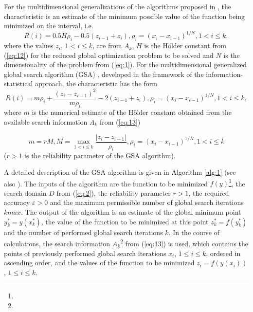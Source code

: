 \documentclass[review]{elsarticle}
\begin{document}
For the multidimensional generalizations of the algorithms proposed in \cite{c34,c35}, the characteristic is an estimate of the minimum possible value of the function being minimized on the interval, i.e.
\begin{equation}\label{eq:17}
R(i)=0.5 H \rho_i - 0.5 (z_{i-1} + z_i), \rho_i=(x_i - x_{i-1})^{1/N}, 1 < i \leq k,
\end{equation}
where the values $z_i$, $1<i \leq k$, are from $A_k$, $H$ is the H\"older constant from (\ref{eq:12}) for the reduced global optimization problem to be solved and $N$ is the dimensionality of the problem from (\ref{eq:1}). For the multidimensional generalized global search algorithm (GSA) \cite{c6,c23}, developed in the framework of the information-statistical approach, the characteristic has the form
\begin{equation}\label{eq:18}
R(i)=m \rho_i+\frac{(z_i-z_{i-1})^2}{m \rho_i }-2(z_{i-1}+z_i ), \rho_i=(x_i-x_{i-1})^{1/N}  ,1 < i \leq k,
\end{equation}
where $m$ is the numerical estimate of the H\"older constant obtained from the available search information $A_k$ from (\ref{eq:13})

\begin{equation}\label{eq:19}
m=r M, M=\max_{1 < i \leq k} \frac{|z_i-z_{i-1}|}{\rho_i}, \rho_i=(x_i-x_{i-1})^{1/N}  ,1 < i \leq k
\end{equation}
($r>1$ is the reliability parameter of the GSA algorithm).

A detailed description of the GSA algorithm is given in Algorithm \ref{alg:1} (see also \cite{c6}). The inputs of the algorithm are the function to be minimized $f(y)$\footnote{ }, the search domain $D$ from (\ref{eq:2}), the reliability parameter $r > 1$, the required accuracy $\varepsilon > 0$ and the maximum permissible number of global search iterations $kmax$. The output of the algorithm is an estimate of the global minimum point $y_k^* =y(x_k^*)$, the value of the function to be minimized at this point $z_k^* =f(y_k^*)$  and the number of performed global search iterations $k$. In the course of calculations, the search information $A_k$\footnote{ } from (\ref{eq:13}) is used, which contains the points of previously performed global search iterations $x_i$, $1 \leq i \leq k$, ordered in ascending order, and the values of the function to be minimized $z_i=f(y(x_i))$, $1\leq i \leq k$.
\end{document}
